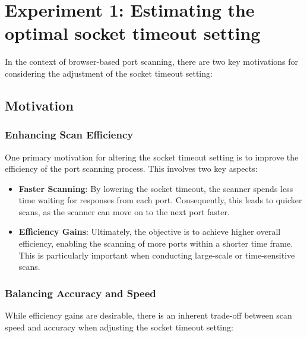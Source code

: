 
\section{Experiment 1: Estimating the optimal socket timeout setting}
\label{section:socket-timeout-setting}

In the context of browser-based port scanning, there are two key motivations for considering the adjustment of the socket timeout setting:
\subsection{Motivation}
\subsubsection{Enhancing Scan Efficiency}

One primary motivation for altering the socket timeout setting is to improve the efficiency of the port scanning process. This involves two key aspects:

\begin{itemize}
  \item \textbf{Faster Scanning}: By lowering the socket timeout, the scanner spends less time waiting for responses from each port. Consequently, this leads to quicker scans, as the scanner can move on to the next port faster.

  \item \textbf{Efficiency Gains}: Ultimately, the objective is to achieve higher overall efficiency, enabling the scanning of more ports within a shorter time frame. This is particularly important when conducting large-scale or time-sensitive scans.
\end{itemize}

\subsubsection{Balancing Accuracy and Speed}

While efficiency gains are desirable, there is an inherent trade-off between scan speed and accuracy when adjusting the socket timeout setting:


